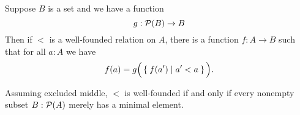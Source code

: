 \documentclass[hott-all.tex]{subfiles}
\begin{document}
% 
\begin{lem}
  Suppose $B$ is a set and we have a function
  \[ g : \mathcal{P}(B) \to B \]
  Then if $<$ is a well-founded relation on $A$, there is a function $f:A\to B$ such that for all $a:A$ we have
  \begin{equation*}
    f(a) = g\Big(\Set{ f(a') | a'<a }\Big).
  \end{equation*}
\end{lem}
% 
% 
% 
\begin{lem}
  Assuming excluded middle, $<$ is well-founded if and only if every nonempty subset $B: \mathcal{P}(A)$ merely has a minimal element.
\end{lem}
% 
\end{document}
